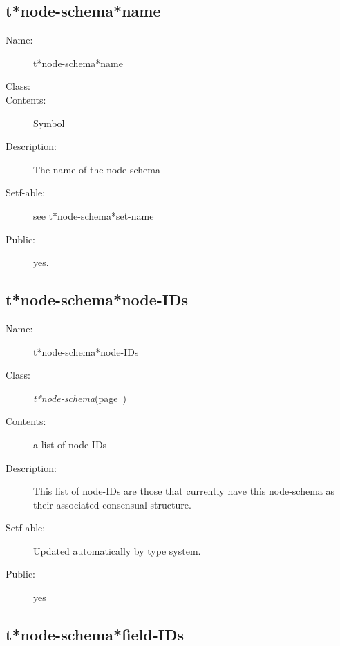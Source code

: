 \subsection{t*node-schema*name}
\label{t*node-schema*name}

\begin{description}
\item [Name:]  t*node-schema*name

\item [Class:] 

\item [Contents:] Symbol 

\item [Description:] The name of the node-schema

\item [Setf-able:] see t*node-schema*set-name

\item [Public:] yes.



\end{description}
\horizontalline

\subsection{t*node-schema*node-IDs}
\label{t*node-schema*node-IDs}

\begin{description}
\item [Name:]  t*node-schema*node-IDs

\item [Class:] {\sl t*node-schema}\hfill(page~\pageref{t*node-schema})

\item [Contents:] a list of node-IDs

\item [Description:]

This list of node-IDs are those that currently have
this node-schema as their associated consensual structure.

\item [Setf-able:] Updated automatically by type system. 

\item [Public:] yes



\end{description}
\horizontalline

\subsection{t*node-schema*field-IDs}
\label{t*node-schema*field-IDs}

